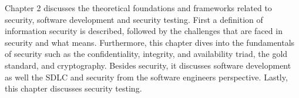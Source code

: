 Chapter 2 discusses the theoretical foundations and frameworks related to security, software development and security testing. First a definition of information security is described, followed by the challenges that are faced in security and what  means. Furthermore, this chapter dives into the fundamentals of security such as the confidentiality, integrity, and availability triad, the gold standard, and cryptography. Besides security, it discusses software development as well the SDLC and security from the software engineers perspective. Lastly, this chapter discusses security testing.

